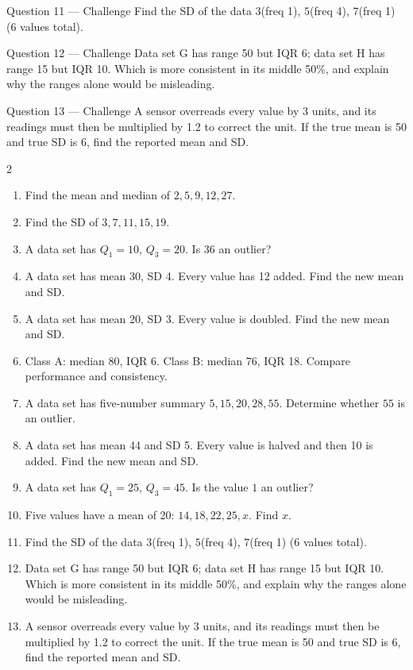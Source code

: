 \documentclass[11pt]{article}
\begin{document}
\begin{qbox}{Question 11 --- Challenge}
Find the SD of the data $3$(freq 1), $5$(freq 4), $7$(freq 1) (6 values total).\workspace{3.4cm}
\end{qbox}

\begin{qbox}{Question 12 --- Challenge}
Data set G has range 50 but IQR 6; data set H has range 15 but IQR 10. Which is more consistent in its middle 50\%, and explain why the ranges alone would be misleading.\workspace{3.2cm}
\end{qbox}

\begin{qbox}{Question 13 --- Challenge}
A sensor overreads every value by 3 units, and its readings must then be multiplied by 1.2 to correct the unit. If the true mean is 50 and true SD is 6, find the reported mean and SD.\workspace{3.2cm}
\end{qbox}

\clearpage
{}

\begin{recapbox}
\begin{multicols}{2}
\small
\begin{enumerate}[leftmargin=*,itemsep=3pt]
  \item Find the mean and median of $2,5,9,12,27$.
  \item Find the SD of $3,7,11,15,19$.
  \item A data set has $Q_1=10$, $Q_3=20$. Is $36$ an outlier?
  \item A data set has mean 30, SD 4. Every value has 12 added. Find the new mean and SD.
  \item A data set has mean 20, SD 3. Every value is doubled. Find the new mean and SD.
  \item Class A: median 80, IQR 6. Class B: median 76, IQR 18. Compare performance and consistency.
  \item A data set has five-number summary $5,15,20,28,55$. Determine whether $55$ is an outlier.
  \item A data set has mean 44 and SD 5. Every value is halved and then 10 is added. Find the new mean and SD.
  \item A data set has $Q_1=25$, $Q_3=45$. Is the value $1$ an outlier?
  \item Five values have a mean of 20: $14,18,22,25,x$. Find $x$.
  \item Find the SD of the data $3$(freq 1), $5$(freq 4), $7$(freq 1) (6 values total).
  \item Data set G has range 50 but IQR 6; data set H has range 15 but IQR 10. Which is more consistent in its middle 50\%, and explain why the ranges alone would be misleading.
  \item A sensor overreads every value by 3 units, and its readings must then be multiplied by 1.2 to correct the unit. If the true mean is 50 and true SD is 6, find the reported mean and SD.
\end{enumerate}
\end{multicols}
\end{recapbox}
\end{document}
